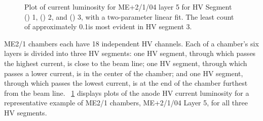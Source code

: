 \begin{figure}
    \caption[Plot of current \vs luminosity for ME+2/1/04 layer 5 for three HV Segments with a two-parameter linear fit.]{Plot of current \vs luminosity for ME+2/1/04 layer 5 for HV Segment () 1, () 2, and () 3, with a two-parameter linear fit. The least count of approximately 0.1\muA is most evident in HV segment 3.}
    \label{fig:ME21_curr_lumi_p214_5}
\end{figure}

ME2/1 chambers each have 18 independent HV channels. Each of a chamber's six layers is divided into three HV segments: one HV segment, through which passes the highest current, is close to the beam line; one HV segment, through which passes a lower current, is in the center of the chamber; and one HV segment, through which passes the lowest current, is at the end of the chamber furthest from the beam line. \Fig~\ref{fig:ME21_curr_lumi_p214_5} displays plots of the anode HV current \vs luminosity for a representative example of ME2/1 chambers, ME+2/1/04 Layer 5, for all three HV segments.

